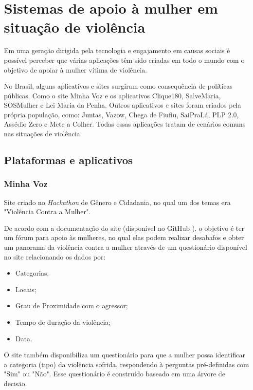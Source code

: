 \chapter{Sistemas de apoio à mulher em situação de violência} \label{cap:sistemas_relacionados}

Em uma geração dirigida pela tecnologia e engajamento em causas sociais é possível perceber que várias aplicações têm sido criadas em todo o mundo com o objetivo de apoiar à mulher vítima de violência.

No Brasil, alguns aplicativos e sites surgiram como consequência de políticas públicas. Como o site Minha Voz \cite{minhavoz_site} e 
os aplicativos Clique180, SalveMaria, SOSMulher e Lei Maria da Penha. Outros aplicativos e sites foram criados pela própria população, como: Juntas, Vazow, 
Chega de Fiufiu, 
SaiPraLá, PLP 2.0, Assédio Zero e Mete a Colher. Todas essas aplicações tratam de cenários comuns nas situações de 
violência.

\section{Plataformas e aplicativos}

\subsection*{Minha Voz}

Site criado no \textit{Hackathon} de Gênero e Cidadania, no qual
um dos temas era "Violência Contra a Mulher". 

De acordo com a documentação do site (disponível no GitHub \cite{minhavoz_repo}), o objetivo é ter um fórum para apoio às mulheres, no qual elas podem
realizar desabafos e obter um panorama da violência contra a mulher através de um questionário
disponível no site relacionando os dados por:

\begin{itemize}
	\item Categorias;
	\item Locais;
	\item Grau de Proximidade com o agressor;
	\item Tempo de duração da violência;
	\item Data.
\end{itemize}

O site também disponibiliza um questionário para que a mulher possa identificar a categoria (tipo) da violência sofrida, respondendo à perguntas pré-definidas 
com "Sim" ou "Não". Esse questionário é construído baseado em uma árvore de decisão.

